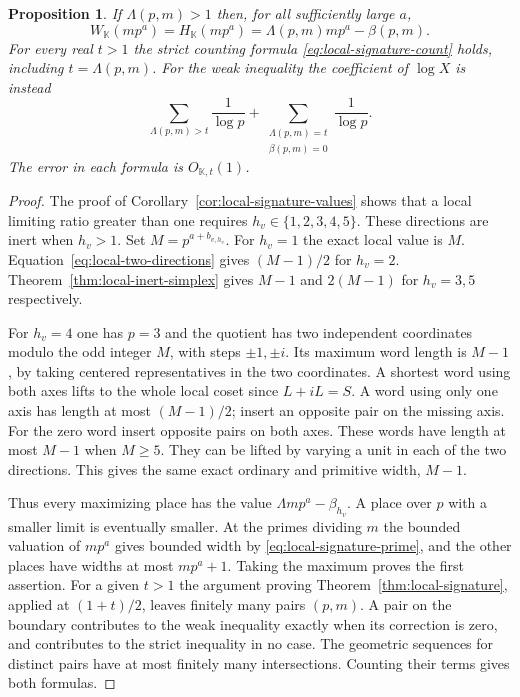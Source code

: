 \documentclass[11pt,letterpaper]{article}
\newtheorem{proposition}[proposition]{Proposition}
\theoremstyle{definition}
\numberwithin{equation}{section}
\begin{document}
\begin{proposition}\label{prop:local-sharp-jumps}
If $\Lambda(p,m)>1$ then, for all sufficiently large $a$,
\[
 W_{\mathbb K}(mp^a)=H_{\mathbb K}(mp^a)
                    =\Lambda(p,m)mp^a-\beta(p,m).
\]
For every real $t>1$ the strict counting formula
\eqref{eq:local-signature-count} holds, including
$t=\Lambda(p,m)$. For the weak inequality the coefficient of
$\log X$ is instead
\[
 \sum_{\Lambda(p,m)>t}\frac1{\log p}
  +\sum_{\substack{\Lambda(p,m)=t\\\beta(p,m)=0}}\frac1{\log p}.
\]
The error in each formula is $O_{\mathbb K,t}(1)$.
\end{proposition}
\begin{proof}
The proof of Corollary~\ref{cor:local-signature-values} shows that a
local limiting ratio greater than one requires $h_v\in\{1,2,3,4,5\}$.
These directions are inert when $h_v>1$. Set $M=p^{a+b_{v,h_v}}$.
For $h_v=1$ the exact local value is $M$.
Equation~\eqref{eq:local-two-directions} gives $(M-1)/2$ for $h_v=2$.
Theorem~\ref{thm:local-inert-simplex} gives $M-1$ and $2(M-1)$
for $h_v=3,5$ respectively.

For $h_v=4$ one has $p=3$ and the quotient has two independent
coordinates modulo the odd integer $M$, with steps $\pm1,\pm i$.
Its maximum word length is $M-1$, by taking centered representatives
in the two coordinates. A shortest word using both axes lifts to the
whole local coset since $L+iL=S$. A word using only one axis has
length at most $(M-1)/2$; insert an opposite pair on the missing axis.
For the zero word insert opposite pairs on both axes. These words
have length at most $M-1$ when $M\ge5$. They can be lifted by varying
a unit in each of the two directions. This gives the same exact
ordinary and primitive width, $M-1$.

Thus every maximizing place has the value
$\Lambda mp^a-\beta_{h_v}$. A place over $p$ with a smaller limit
is eventually smaller. At the primes dividing $m$ the bounded
valuation of $mp^a$ gives bounded width by
\eqref{eq:local-signature-prime}, and the other places have widths
at most $mp^a+1$. Taking the maximum proves the first assertion.
For a given $t>1$ the argument proving Theorem~\ref{thm:local-signature},
applied at $(1+t)/2$, leaves finitely many pairs $(p,m)$.
A pair on the boundary contributes to the weak inequality exactly
when its correction is zero, and contributes to the strict inequality
in no case. The geometric sequences for distinct pairs have at most
finitely many intersections. Counting their terms gives both formulas.
\end{proof}
\end{document}
